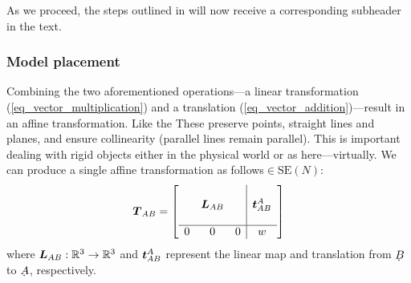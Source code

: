 As we proceed, the steps outlined in  will now receive a corresponding subheader in the text.

\subsubsection{Model placement}

Combining the two aforementioned operations---a linear transformation (\ref{eq_vector_multiplication}) and a translation (\ref{eq_vector_addition})---result in an affine transformation. Like the These preserve points, straight lines and planes, and ensure collinearity (parallel lines remain parallel). This is important dealing with rigid objects either in the physical world or as here---virtually. We can produce a single affine transformation as follows$\in\mathrm{SE}(N)$:
%
\begin{align}\label{eq:T_definition}
\mat{T}_{AB}
= \left[\begin{array}{c c c | c}
& & &   \\
& \mat{L}_{AB}  & & \dvec{t}_{AB}^A \\
& & &  \\\hline
 0 &  0  &  0  &  w
\end{array}\right] 
\end{align}
where $\boldsymbol{L}_{AB}: \mathbb{R}^3 \to \mathbb{R}^3$ and $\boldsymbol{t}_{AB}^A$ represent the linear map and translation from $\udot{B}$ to $\udot{A}$, respectively.







